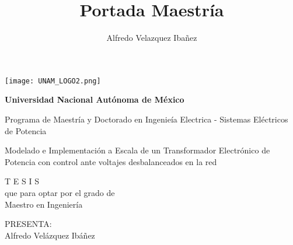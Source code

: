 \documentclass[12pt, oneside]{book}
\title{Portada Maestría}
\author{Alfredo Velazquez Ibañez}
\begin{document}
	\begin{titlepage}
		\setlength{\parindent}{0pt} \setlength{\parskip}{0pt}
	
		\begin{center}
			\vfill 
			
			\begin{minipage}{\textwidth}
				
				
				\begin{center}
					\texttt{[image: UNAM\_LOGO2.png]}	
				\end{center} 	
				\begin{center}
					\Huge\textbf{Universidad Nacional Aut\'onoma de M\'exico}
				\end{center} 
				
			\end{minipage}
				
			\vfill
			
			\begin{minipage}{0.7\textwidth}
				\begin{center}
					\large Programa de Maestr\'ia y Doctorado en Ingenie\'ia Electrica - Sistemas El\'ectricos de Potencia
				\end{center}
			\end{minipage}
			\begin{center}
				
				\vfill
				\vfill
				\large Modelado e Implementaci\'on a Escala de un Transformador Electr\'onico de Potencia con control ante voltajes desbalanceados en la red
				
			\end{center}
			
			\begin{center}
				\vspace*{1cm}
				{\huge T E S I S}\\
				\vspace*{1cm}
				que para optar por el grado de \\ \bigskip
				{\large {Maestro en Ingenier\'ia}} \\ \bigskip
				
				\begin{center}
					PRESENTA: \\
					\large Alfredo Vel\'azquez Ib\'añez
				\end{center}
				

\end{center}
\end{center}
\end{titlepage}
\end{document}
